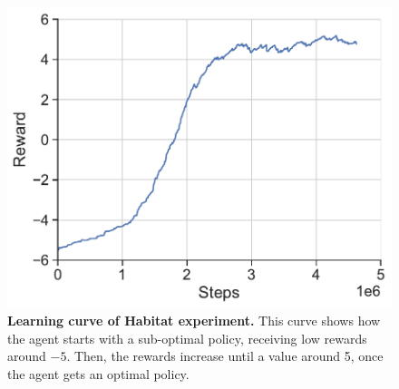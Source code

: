 \begin{figure}
    \centering
    \includegraphics[width=0.8\linewidth]{figures/understanding_vsn/habitat_reward}
    \caption{\textbf{Learning curve of Habitat experiment.} This curve shows how the agent starts with a sub-optimal policy, receiving low rewards around $-5$. Then, the rewards increase until a value around 5, once the agent gets an optimal policy.}
    \label{fig:reward-habitat-results}
\end{figure}

